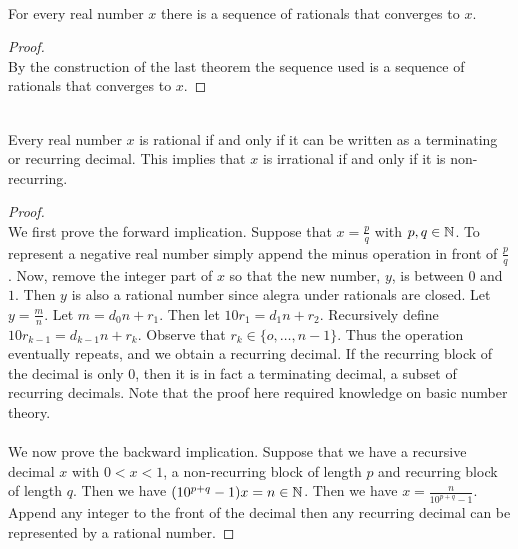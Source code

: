 \documentclass[a4paper]{article}
\begin{document}
\begin{lmm}{}{}\\ For every real number $x$ there is a sequence of rationals that converges to $x$. 
\begin{proof}\\ By the construction of the last theorem the sequence used is a sequence of rationals that converges to $x$. 
\end{proof}
\end{lmm} 

\begin{thm}{}{}\\ Every real number $x$ is rational if and only if it can be written as a terminating or recurring decimal. This implies that $x$ is irrational if and only if it is non-recurring. 
\begin{proof}\\ We first prove the forward implication. Suppose that $x=\frac{p}{q}$ with $p,q\in\mathbb{N}$. To represent a negative real number simply append the minus operation in front of $\frac{p}{q}$. Now, remove the integer part of $x$ so that the new number, $y$, is between $0$ and $1$. Then $y$ is also a rational number since alegra under rationals are closed. Let $y=\frac{m}{n}$. Let $m=d_0n+r_1$. Then let $10r_1=d_1n+r_2$. Recursively define $10r_{k-1}=d_{k-1}n+r_k$. Observe that $r_k\in\{o,\dots,n-1\}$. Thus the operation eventually repeats, and we obtain a recurring decimal. If the recurring block of the decimal is only $0$, then it is in fact a terminating decimal, a subset of recurring decimals. Note that the proof here required knowledge on basic number theory. \\~\\
We now prove the backward implication. Suppose that we have a recursive decimal $x$ with $0<x<1$, a non-recurring block of length $p$ and recurring block of length $q$. Then we have $(10^{p+q}-1)x=n\in\mathbb{N}$. Then we have $x=\frac{n}{10^{p+q}-1}$. Append any integer to the front of the decimal then any recurring decimal can be represented by a rational number. 
\end{proof}
\end{thm}
\end{document}
